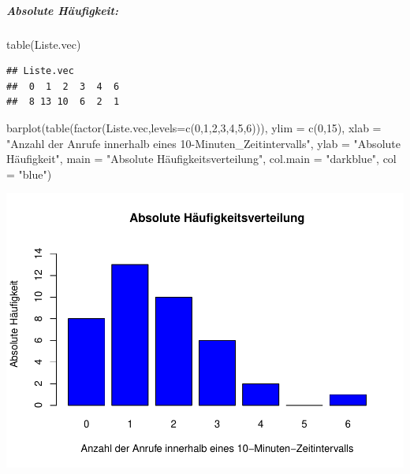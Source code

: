 \documentclass[
]{article}
\newenvironment{Shaded}{\begin{snugshade}}{\end{snugshade}}
\newcommand{\AttributeTok}[1]{\textcolor[rgb]{0.77,0.63,0.00}{#1}}
\newcommand{\DecValTok}[1]{\textcolor[rgb]{0.00,0.00,0.81}{#1}}
\newcommand{\FunctionTok}[1]{\textcolor[rgb]{0.00,0.00,0.00}{#1}}
\newcommand{\NormalTok}[1]{#1}
\newcommand{\StringTok}[1]{\textcolor[rgb]{0.31,0.60,0.02}{#1}}
\begin{document}
\hypertarget{absolute-huxe4ufigkeit}{%
\subparagraph{\texorpdfstring{\textbf{Absolute
Häufigkeit:}}{Absolute Häufigkeit:}}\label{absolute-huxe4ufigkeit}}

\begin{Shaded}
\begin{Highlighting}[]
\FunctionTok{table}\NormalTok{(Liste.vec)}
\end{Highlighting}
\end{Shaded}

\begin{verbatim}
## Liste.vec
##  0  1  2  3  4  6 
##  8 13 10  6  2  1
\end{verbatim}

\begin{Shaded}
\begin{Highlighting}[]
\FunctionTok{barplot}\NormalTok{(}\FunctionTok{table}\NormalTok{(}\FunctionTok{factor}\NormalTok{(Liste.vec,}\AttributeTok{levels=}\FunctionTok{c}\NormalTok{(}\DecValTok{0}\NormalTok{,}\DecValTok{1}\NormalTok{,}\DecValTok{2}\NormalTok{,}\DecValTok{3}\NormalTok{,}\DecValTok{4}\NormalTok{,}\DecValTok{5}\NormalTok{,}\DecValTok{6}\NormalTok{))), }\AttributeTok{ylim =} \FunctionTok{c}\NormalTok{(}\DecValTok{0}\NormalTok{,}\DecValTok{15}\NormalTok{), }\AttributeTok{xlab =} \StringTok{"Anzahl der Anrufe innerhalb eines 10{-}Minuten\_Zeitintervalls"}\NormalTok{, }\AttributeTok{ylab =} \StringTok{"Absolute Häufigkeit"}\NormalTok{, }\AttributeTok{main =} \StringTok{"Absolute Häufigkeitsverteilung"}\NormalTok{, }\AttributeTok{col.main =} \StringTok{"darkblue"}\NormalTok{, }\AttributeTok{col =} \StringTok{"blue"}\NormalTok{)}
\end{Highlighting}
\end{Shaded}

\includegraphics{Uebung1_StefanDuenser_files/figure-latex/unnamed-chunk-3-1.pdf}
\end{document}
